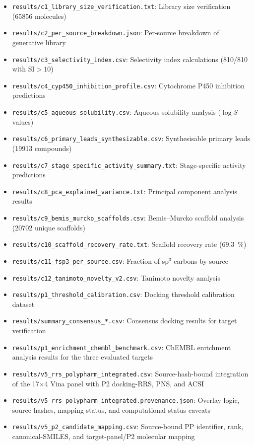 \documentclass[journal=jcisd8,manuscript=suppinfo]{achemso}
\begin{document}
\begin{itemize}
  \item \texttt{results/c1\_library\_size\_verification.txt}: Library size verification (\num{65856} molecules)
  \item \texttt{results/c2\_per\_source\_breakdown.json}: Per-source breakdown of generative library
  \item \texttt{results/c3\_selectivity\_index.csv}: Selectivity index calculations (\num{810}/\num{810} with $\text{SI} > \num{10}$)
  \item \texttt{results/c4\_cyp450\_inhibition\_profile.csv}: Cytochrome P450 inhibition predictions
  \item \texttt{results/c5\_aqueous\_solubility.csv}: Aqueous solubility analysis ($\log S$ values)
  \item \texttt{results/c6\_primary\_leads\_synthesizable.csv}: Synthesisable primary leads (\num{19913} compounds)
  \item \texttt{results/c7\_stage\_specific\_activity\_summary.txt}: Stage-specific activity predictions
  \item \texttt{results/c8\_pca\_explained\_variance.txt}: Principal component analysis results
  \item \texttt{results/c9\_bemis\_murcko\_scaffolds.csv}: Bemis--Murcko scaffold analysis (\num{20702} unique scaffolds)
  \item \texttt{results/c10\_scaffold\_recovery\_rate.txt}: Scaffold recovery rate (\qty{69.3}{\percent})
  \item \texttt{results/c11\_fsp3\_per\_source.csv}: Fraction of sp$^3$ carbons by source
  \item \texttt{results/c12\_tanimoto\_novelty\_v2.csv}: Tanimoto novelty analysis
  \item \texttt{results/p1\_threshold\_calibration.csv}: Docking threshold calibration dataset
  \item \texttt{results/summary\_consensus\_*.csv}: Consensus docking results for target verification
  \item \texttt{results/p1\_enrichment\_chembl\_benchmark.csv}: ChEMBL enrichment analysis results for the three evaluated targets
  \item \texttt{results/v5\_rrs\_polypharm\_integrated.csv}: Source-hash-bound integration of the 17$\times$4 Vina panel with P2 docking-RRS, PNS, and ACSI
  \item \texttt{results/v5\_rrs\_polypharm\_integrated.provenance.json}: Overlay logic, source hashes, mapping status, and computational-status caveats
  \item \texttt{results/v5\_p2\_candidate\_mapping.csv}: Source-bound PP identifier, rank, canonical-SMILES, and target-panel/P2 molecular mapping
\end{itemize}
\end{document}
